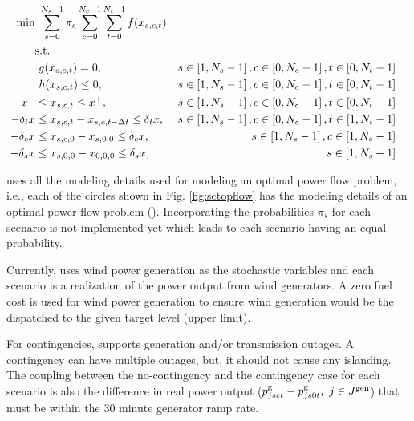 \begin{align}
\centering
\text{min}&~\sum_{s=0}^{N_s-1}\pi_s\sum_{c=0}^{N_c-1}\sum_{t=0}^{N_t-1}f(x_{s,c,t})&  \label{eq:sctopflow_start}\\
&\text{s.t.}& \nonumber \\
&~g(x_{s,c,t}) = 0,                                        &s \in \left[1,N_s-1\right],c \in \left[0,N_c-1\right], t \in \left[0,N_t-1\right]& \\
&~h(x_{s,c,t}) \le 0,                                      &s \in \left[1,N_s-1\right],c \in \left[0,N_c-1\right], t \in \left[0,N_t-1\right]& \\
x^- & \le x_{s,c,t} \le x^+,                               &s \in \left[1,N_s-1\right],c \in \left[0,N_c-1\right], t\in \left[0,N_t-1\right]& \\
-\delta_t{x} & \le x_{s,c,t} - x_{s,c,t-\Delta{t}} \le \delta_t{x},&s \in \left[1,N_s-1\right],c \in \left[0,N_c-1\right], t \in \left[1,N_t-1\right]& \label{eq:sctopflow_time_coupling}\\
-\delta_c{x} & \le x_{s,c,0} - x_{s,0,0} \le \delta_c{x},&s \in \left[1,N_s-1\right],c \in \left[1,N_c-1\right]&
\label{eq:sctopflow_contingency_coupling} \\
-\delta_s{x} & \le x_{s,0,0} - x_{0,0,0} \le \delta_s{x},&s \in \left[1,N_s-1\right]&
\label{eq:sctopflow_end}
\end{align}

{\sopflow} uses all the modeling details used for modeling an optimal power flow problem, i.e., each of the circles shown in Fig. \ref{fig:sctopflow} has the modeling details of an optimal power flow problem (\opflow). Incorporating the probabilities $\pi_s$ for each scenario is not implemented yet which leads to each scenario having an equal probability. 

Currently, \sopflow uses wind power generation as the stochastic variables and each scenario is a realization of the power output from wind generators. A zero fuel cost is used for wind power generation to ensure wind generation would be the dispatched to the given target level (upper limit). 

For contingencies, \sopflow supports generation and/or transmission outages. A contingency can have multiple outages, but, it should not cause any islanding. The coupling between the no-contingency and the contingency case for each scenario is also the difference in real power output ($p_{jsct}^{\text{g}} - p_{js0t}^{\text{g}},~ j \in J^\text{gen}$) that must be within the 30 minute generator ramp rate.

